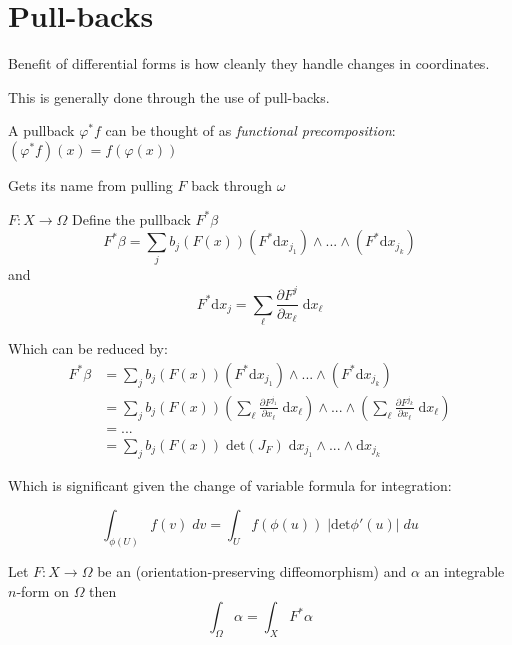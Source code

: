 \section{Pull-backs}

Benefit of differential forms is how cleanly they handle changes in coordinates.

This is generally done through the use of pull-backs.

A pullback $\varphi^* f$ can be thought of as \emph{functional precomposition}: $(\varphi^* f) (x) = f(\varphi(x))$


Gets its name from pulling $F$ back through $\omega$

\begin{definition}
$F: X \to \Omega$
Define the pullback $F^* \beta$
\begin{equation}
F^* \beta = \sum_j  b_j ( F(x)) (F^* \text{d}x_{j_1}) \wedge ... \wedge (F^* \text{d} x_{j_k})
\end{equation}
and
\begin{equation}
F^* \text{d}x_j = \sum_\ell \frac{\partial F^j}{\partial x_\ell} \; \text{d} x_\ell
\end{equation}
\end{definition}

Which can be reduced by:
\begin{align}
F^ * \beta & = \sum_j  b_j ( F(x)) (F^* \text{d}x_{j_1}) \wedge ... \wedge (F^* \text{d} x_{j_k}) \\
& = \sum_j  b_j ( F(x))  
\left( \sum_\ell \frac{\partial F^{j_1}}{\partial x_\ell} \; \text{d} x_\ell \right)
\wedge ... \wedge  
\left( \sum_\ell \frac{\partial F^{j_k}}{\partial x_\ell} \; \text{d} x_\ell \right) \\
& = ... \\
& = \sum_j b_j ( F(x)) \; \text{det}\left( J_F \right) \; \text{d}x_{j_1} \wedge ... \wedge \text{d} x_{j_k}
\end{align}

Which is significant given the change of variable formula for integration:

\begin{equation}
\int_{\phi(U)} \! f(v) \; dv = \int_U \! f(\phi(u)) \; |\text{det}\phi'(u)| \; du
\end{equation}

\begin{theorem}
Let $F : X  \to \Omega$ be an (orientation-preserving diffeomorphism) and $\alpha$ an integrable $n$-form on $\Omega$ then
\begin{equation}
\int_\Omega \alpha = \int_X F^* \alpha
\end{equation}
\end{theorem}

